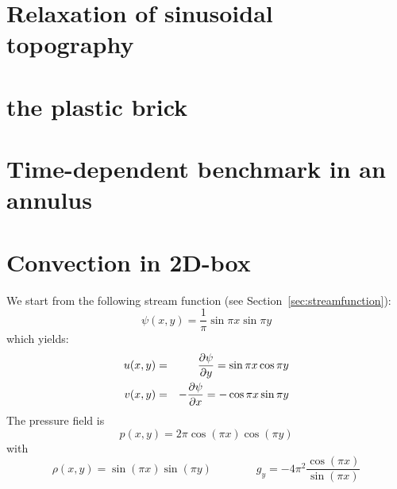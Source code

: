  
\section{Relaxation of sinusoidal topography}


\section{the plastic brick} \label{ss:plasticbrick}


\section{Time-dependent benchmark in an annulus}\label{sec:tdba}














\section{Convection in 2D-box} \label{sec:citb}

We start from the following stream function (see Section~\ref{sec:streamfunction}):
\begin{equation}
\psi(x,y)=\frac{1}{\pi} \sin \pi x \sin \pi y
\end{equation}
which yields:
\begin{eqnarray}
u(x,y)&=&\frac{\partial \psi}{\partial y} = \sin \pi x \cos \pi y \nonumber\\
v(x,y)&=&-\frac{\partial \psi}{\partial x} = - \cos \pi x \sin \pi y
\end{eqnarray}
The pressure field is 
\begin{equation}
p(x,y) = 2\pi \cos (\pi x) \cos (\pi y) 
\end{equation}
with 
\begin{equation}
\rho(x,y)=\sin(\pi x) \sin (\pi y)
\qquad\qquad
g_y = -4\pi ^2 \frac{\cos (\pi x)}{\sin (\pi x)}
\end{equation}

